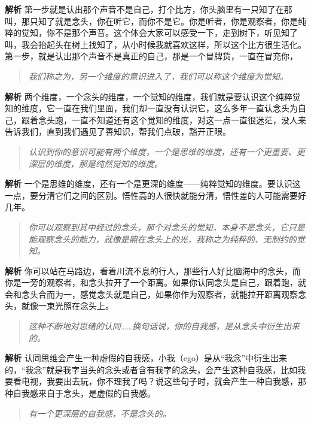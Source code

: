 \textbf{解析} 第一步就是认出那个声音不是自己，打个比方，你头脑里有一只知了在那叫，那只知了就是念头，你在听它，而你不是它。你是听者，你是观察者，你是纯粹的觉知，你不是那个声音。这个体会大家可以感受一下，走到树下，听见知了叫，我会抬起头在树上找知了，从小时候我就喜欢这样，所以这个比方很生活化。第一步，就是认出那个声音不是真正的自己，那是一个冒牌货，一直在冒充你，

\begin{quote}\it
    我们称之为，另一个维度的意识进入了，我们可以称这个维度为觉知。
\end{quote}

\textbf{解析} 两个维度，一个念头的维度，一个觉知的维度，我们就是要认识这个纯粹觉知的维度，它一直在我们里面，我们却一直没有认识它，这么多年一直认念头为自己，跟着念头跑，一直不知道还有这个觉知的维度，对这一点一直很迷茫，没人来告诉我们，直到我们遇见了善知识，帮我们点破，豁开正眼。

\begin{quote}\it
    认识到你的意识可能有两个维度，一个是思维的维度，还有一个更重要、更深层的维度，那是纯然觉知的维度。
\end{quote}

\textbf{解析} 一个是思维的维度，还有一个是更深的维度——纯粹觉知的维度。要认识这一点，要分清它们之间的区别。悟性高的人很快就能分清，悟性差的人可能需要好几年。

\begin{quote}\it
    你可以观察到其中经过的念头，那个对念头的觉知，本身不是念头，它只是能观察念头的能力，就像是照在念头上的光，我称之为纯粹的、无制约的觉知。
\end{quote}

\textbf{解析} 你可以站在马路边，看着川流不息的行人，那些行人好比脑海中的念头，而你是一旁的观察者，和念头拉开了一个距离。如果你认同念头是自己，跟着跑，就会和念头合而为一，感觉念头就是自己，如果你作为观察者，就能拉开距离观察念头，就像一束光照在念头上。

\begin{quote}\it
    这种不断地对思绪的认同……换句话说，你的自我感，是从念头中衍生出来的。
\end{quote}

\textbf{解析} 认同思维会产生一种虚假的自我感，小我（ego）是从“我念”中衍生出来的，“我念”就是我字当头的念头或者含有我字的念头，会产生这种自我感，比如我要看电视，我要出去玩，你不理我了吗？说这些句子时，就会产生一种自我感，那种自我感来自于念头，是虚假的自我感。

\begin{quote}\it
    有一个更深层的自我感，不是念头的。
\end{quote}

